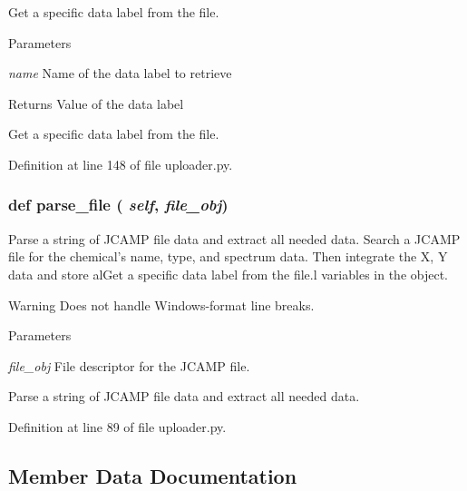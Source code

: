 Get a specific data label from the file. 
\begin{DoxyParams}{Parameters}
\item[{\em name}]Name of the data label to retrieve \end{DoxyParams}
\begin{DoxyReturn}{Returns}
Value of the data label\begin{DoxyVerb}Get a specific data label from the file.\end{DoxyVerb}
 
\end{DoxyReturn}


Definition at line 148 of file uploader.py.\hypertarget{classuploader_1_1_spectrum_transfer_a14401ccceaf67f005506de0a8320b089}{
\subsubsection[{parse\_\-file}]{\setlength{\rightskip}{0pt plus 5cm}def parse\_\-file ( {\em self}, \/   {\em file\_\-obj})}}
\label{classuploader_1_1_spectrum_transfer_a14401ccceaf67f005506de0a8320b089}


Parse a string of JCAMP file data and extract all needed data. Search a JCAMP file for the chemical's name, type, and spectrum data. Then integrate the X, Y data and store alGet a specific data label from the file.l variables in the object. \begin{DoxyWarning}{Warning}
Does not handle Windows-\/format line breaks.
\end{DoxyWarning}

\begin{DoxyParams}{Parameters}
\item[{\em file\_\-obj}]File descriptor for the JCAMP file.\begin{DoxyVerb}Parse a string of JCAMP file data and extract all needed data.\end{DoxyVerb}
 \end{DoxyParams}


Definition at line 89 of file uploader.py.

\subsection{Member Data Documentation}
\hypertarget{classuploader_1_1_spectrum_transfer_a77c112c599aae1eeb8d54936bb435177}{
\subsubsection[{chemical\_\-name}]{}}
\label{classuploader_1_1_spectrum_transfer_a77c112c599aae1eeb8d54936bb435177}


